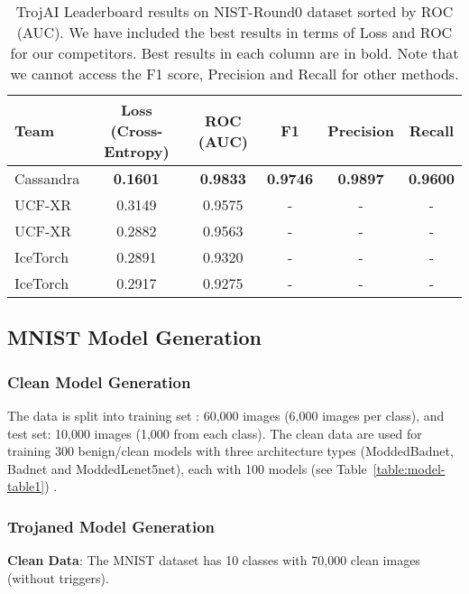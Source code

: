 \documentclass{article}
\begin{document}
\begin{table}[h!!!]
\caption{TrojAI Leaderboard results on NIST-Round0 dataset sorted by ROC (AUC). We have included the best results in terms of Loss and ROC for our competitors. Best results in each column are in bold. Note that we cannot access the F1 score, Precision and Recall for other methods.}
\begin{center}
\label{tab:F1}
\begin{tabular}{|l|c|c|c|c|c|}
\hline
\textbf{Team} & \textbf{Loss (Cross-Entropy)} & \textbf{ROC (AUC)} &\textbf{F1} &\textbf{Precision} & \textbf{Recall} \\ \hline\hline
Cassandra   & {\bf 0.1601} & {\bf 0.9833} & {\bf0.9746}&{\bf0.9897} &{\bf0.9600}\\ \hline
UCF-XR     & 0.3149 & 0.9575 &-&-&-  \\ \hline
UCF-XR     & 0.2882 & 0.9563 &-&-&- \\ \hline
IceTorch   & 0.2891 & 0.9320 &-&-&-\\ \hline
IceTorch   & 0.2917 & 0.9275 &-&-&-\\ \hline
\end{tabular}
\end{center}
\end{table}







\subsection*{ MNIST Model Generation}

\subsubsection*{Clean Model Generation}

 The data is split into training set : 60,000 images (6,000 images per class), and test set: 10,000 images (1,000 from each class). The clean data are used for training 300 benign/clean models with three architecture types (ModdedBadnet, Badnet and ModdedLenet5net), each with 100 models (see Table~\ref{table:model-table1}) .

\subsubsection*{Trojaned Model Generation} 

\textbf{Clean Data}: The MNIST dataset has 10 classes with  70,000 clean images (without triggers). 
\end{document}
